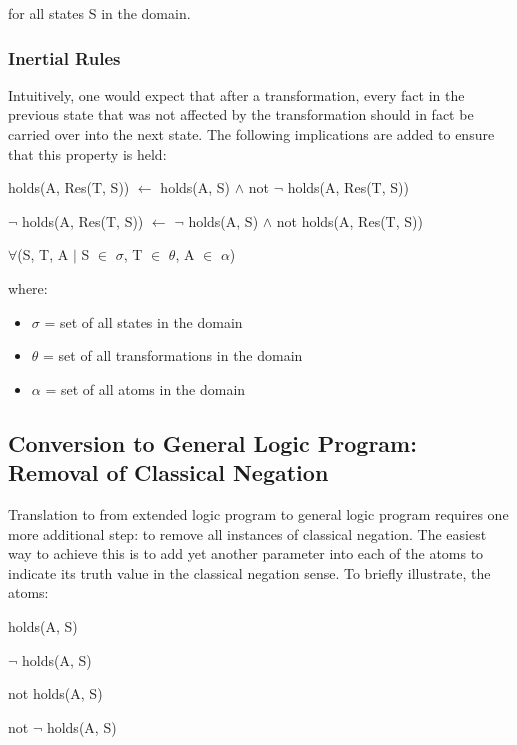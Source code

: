 \documentclass[a4paper,draft]{article}
\begin{document}
        for all states S in the domain.

      \subsubsection{Inertial Rules}

        Intuitively, one would expect that after a transformation, every fact
        in the previous state that was not affected by the transformation
        should in fact be carried over into the next state. The following
        implications are added to ensure that this property is held:

        \begin{list}{}{}
          \item
            holds(A, Res(T, S)) $\leftarrow$ holds(A, S) $\land$ not $\lnot$ 
            holds(A, Res(T, S))
          \item 
            $\lnot$ holds(A, Res(T, S)) $\leftarrow$ $\lnot$ holds(A, S) 
            $\land$ not holds(A, Res(T, S))
        \end{list}

        $\forall$(S, T, A $\mid$ S $\in$ $\sigma$, T $\in$ $\theta$, A $\in$ 
        $\alpha$)

        where: 

        \begin{itemize}
          \item $\sigma$ = set of all states in the domain
          \item $\theta$ = set of all transformations in the domain
          \item $\alpha$ = set of all atoms in the domain
        \end{itemize}

    \subsection{Conversion to General Logic Program: Removal of Classical Negation}

      Translation to from extended logic program to general logic program 
      requires one more additional step: to remove all instances of classical 
      negation. The easiest way to achieve this is to add yet another parameter
      into each of the atoms to indicate its truth value in the classical
      negation sense. To briefly illustrate, the atoms:

      \begin{list}{}{}
        \item holds(A, S)
        \item $\lnot$ holds(A, S)
        \item not holds(A, S)
        \item not $\lnot$ holds(A, S)
      \end{list}
\end{document}
